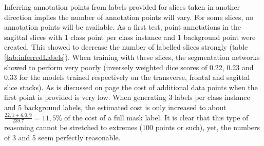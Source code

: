 \par{
    Inferring annotation points from labels provided for slices taken in another direction implies the number of annotation points will vary.
    For some slices, no annotation points will be available.
    As a first test, point annotations in the sagittal slices with 1 class point per class instance and 1 background point were created.
    This showed to decrease the number of labelled slices strongly (table \ref{tab:inferredLabels}). When training with these slices, the segmentation networks showed to perform very poorly
    (inversely weighted dice scores of 0.22, 0.23 and 0.33 for the models trained respectively on the transverse, frontal and sagittal slice stacks).
    As is discussed on page \pageref{sec:trainingData} the cost of additional data points when the first point is provided is very low.
    When generating 3 labels per class instance and 5 background labels, the estimated cost is only increased to about $\frac{22,1 + 6.0,9}{239.7}=11,5\%$ of the cost of a full mask label.
    It is clear that this type of reasoning cannot be stretched to extremes (100 points or such), yet, the numbers of 3 and 5 seem perfectly reasonable.
}
